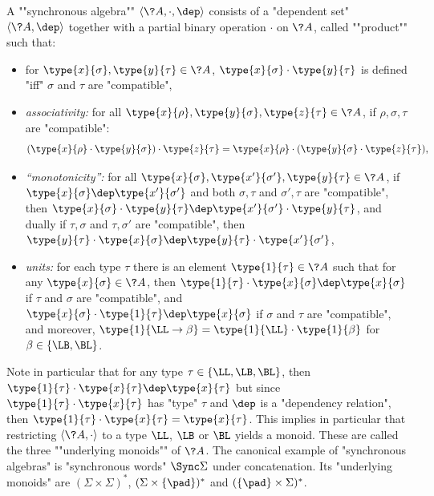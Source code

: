 \begin{definition}
	\AP\label{def:synchronous-algebra}
	A \AP""synchronous algebra"" $\langle \?A, \cdot, \dep \rangle$ consists of a "dependent set" $\langle \?A, \dep \rangle$ together
	with a partial binary operation $\cdot$ on $\?A$, called \AP""product"" such that:
	\begin{itemize}
		\item for $\type{x}{\sigma}, \type{y}{\tau} \in \?A$,
			$\type{x}{\sigma} \cdot \type{y}{\tau}$ is defined "iff" $\sigma$ and $\tau$
			are "compatible",
		\item \emph{associativity:} for all $\type{x}{\rho}, \type{y}{\sigma}, \type{z}{\tau} \in \?A$, if $\rho, \sigma, \tau$ are "compatible":
		\[
			(\type{x}{\rho} \cdot \type{y}{\sigma}) \cdot \type{z}{\tau} 
			= \type{x}{\rho} \cdot (\type{y}{\sigma} \cdot \type{z}{\tau}),
		\]
		\item \emph{``monotonicity'':} for all $\type{x}{\sigma}, \type{x'}{\sigma'}, \type{y}{\tau} \in \?A$, if $\type{x}{\sigma} \dep \type{x'}{\sigma'}$ and
		both $\sigma,\tau$ and $\sigma', \tau$ are "compatible", then
		$\type{x}{\sigma}\cdot \type{y}{\tau} \dep \type{x'}{\sigma'}\cdot \type{y}{\tau}$,
		and dually if $\tau,\sigma$ and $\tau, \sigma'$ are "compatible", then 
		$\type{y}{\tau}\cdot \type{x}{\sigma} \dep \type{y}{\tau}\cdot \type{x'}{\sigma'}$,
		\item \emph{units:} for each type $\tau$ there is an element $\type{1}{\tau} \in \?A$ 
			such that for any $\type{x}{\sigma} \in \?A$, then
			$\type{1}{\tau} \cdot \type{x}{\sigma} \dep \type{x}{\sigma}$
			if $\tau$ and $\sigma$ are "compatible",
			and $\type{x}{\sigma} \cdot \type{1}{\tau} \dep \type{x}{\sigma}$
			if $\sigma$ and $\tau$ are "compatible",
			and moreover, $\type{1}{\LL\to\beta} = \type{1}{\LL}\cdot \type{1}{\beta}$
			for $\beta \in \{\LB,\BL\}$.
	\end{itemize}
\end{definition}

Note in particular that for any type $\tau \in \{\LL,\LB,\BL\}$,
then $\type{1}{\tau} \cdot \type{x}{\tau} \dep \type{x}{\tau}$
but since $\type{1}{\tau} \cdot \type{x}{\tau}$ has "type" $\tau$ and $\dep$ is a
"dependency relation", then $\type{1}{\tau} \cdot \type{x}{\tau} = \type{x}{\tau}$.
This implies in particular that restricting $\langle \?A, \cdot \rangle$
to a type $\LL$, $\LB$ or $\BL$ yields a monoid.
These are called the three \AP""underlying monoids"" of $\?A$.
The canonical example of "synchronous algebras" is "synchronous words" $\Sync\Sigma$ under 
concatenation. Its "underlying monoids" are $(\Sigma\times\Sigma)^*$,
$(\Sigma\times\{\pad\})^*$ and $(\{\pad\}\times\Sigma)^*$.

